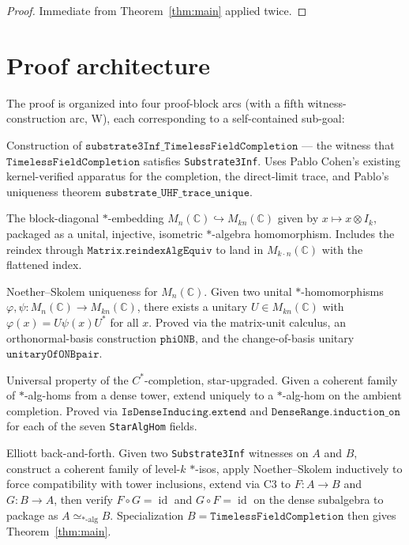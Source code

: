 \documentclass[11pt,a4paper]{article}
\theoremstyle{plain}
\theoremstyle{definition}
\begin{document}
\begin{proof}
Immediate from Theorem~\ref{thm:main} applied twice.
\end{proof}

\section{Proof architecture}
\label{sec:proof}

The proof is organized into four proof-block arcs (with a fifth witness-construction arc, W), each corresponding to a self-contained sub-goal:

\begin{description}[leftmargin=2em]
  \item[Arc W (5 cards):] Construction of $\texttt{substrate3Inf\_TimelessFieldCompletion}$ --- the witness that $\texttt{TimelessFieldCompletion}$ satisfies \texttt{Substrate3Inf}. Uses Pablo Cohen's existing kernel-verified apparatus for the completion, the direct-limit trace, and Pablo's uniqueness theorem $\texttt{substrate\_UHF\_trace\_unique}$.
  \item[Arc C1 (7 cards):] The block-diagonal $\ast$-embedding $M_n(\mathbb{C}) \hookrightarrow M_{kn}(\mathbb{C})$ given by $x \mapsto x \otimes I_k$, packaged as a unital, injective, isometric $\ast$-algebra homomorphism. Includes the reindex through $\texttt{Matrix.reindexAlgEquiv}$ to land in $M_{k \cdot n}(\mathbb{C})$ with the flattened index.
  \item[Arc C2 (12 cards):] Noether--Skolem uniqueness for $M_n(\mathbb{C})$. Given two unital $\ast$-homomorphisms $\varphi, \psi : M_n(\mathbb{C}) \to M_{kn}(\mathbb{C})$, there exists a unitary $U \in M_{kn}(\mathbb{C})$ with $\varphi(x) = U \psi(x) U^{\ast}$ for all $x$. Proved via the matrix-unit calculus, an orthonormal-basis construction $\texttt{phiONB}$, and the change-of-basis unitary $\texttt{unitaryOfONBpair}$.
  \item[Arc C3 (5 cards):] Universal property of the $C^{\ast}$-completion, star-upgraded. Given a coherent family of $\ast$-alg-homs from a dense tower, extend uniquely to a $\ast$-alg-hom on the ambient completion. Proved via $\texttt{IsDenseInducing.extend}$ and $\texttt{DenseRange.induction\_on}$ for each of the seven \texttt{StarAlgHom} fields.
  \item[Arc C4 (11 cards + main):] Elliott back-and-forth. Given two \texttt{Substrate3Inf} witnesses on $A$ and $B$, construct a coherent family of level-$k$ $\ast$-isos, apply Noether--Skolem inductively to force compatibility with tower inclusions, extend via C3 to $F: A \to B$ and $G: B \to A$, then verify $F \circ G = \operatorname{id}$ and $G \circ F = \operatorname{id}$ on the dense subalgebra to package as $A \simeq_{\ast\text{-alg}} B$. Specialization $B = \texttt{TimelessFieldCompletion}$ then gives Theorem~\ref{thm:main}.
\end{description}
\end{document}

